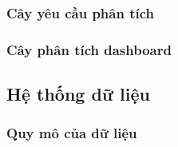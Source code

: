 \documentclass{beamer}
\begin{document}
\subsubsection{Cây yêu cầu phân tích}
\subsubsection{Cây phân tích dashboard}
\subsection{Hệ thống dữ liệu}
\subsubsection{Quy mô của dữ liệu}
\end{document}

